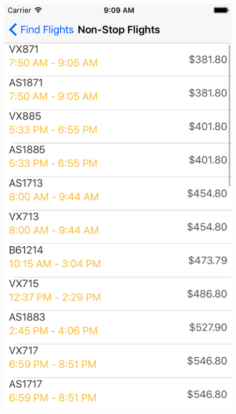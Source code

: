 \documentclass{beamer}
\begin{document}
\begin{frame}
\begin{columns}
\begin{column}{0.3\textwidth}
\begin{center}
        \end{center}
    \end{column}
    \begin{column}{0.3\textwidth}  %
        \begin{center}
            \includegraphics[scale=0.14]{flightsTable}
        \end{center}
    \end{column}
    \begin{column}{0.3\textwidth}  %

\end{column}
\end{columns}
\end{frame}
\end{document}
